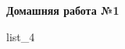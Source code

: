 \documentclass[12pt, a4paper]{article}
\begin{document}
	\begin{center}
		\large
		\textbf{Домашняя работа №1}
	\end{center}
	{list_4}
\end{document}
